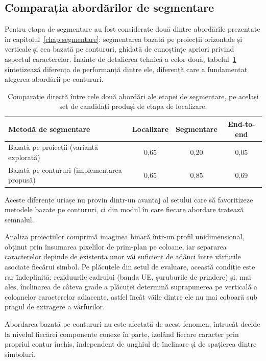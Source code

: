 \subsection{Comparația abordărilor de segmentare}
\indent\par
Pentru etapa de segmentare au fost considerate două dintre abordările prezentate în capitolul~\ref{chap:segmentare}: segmentarea bazată pe proiecții orizontale și verticale și cea bazată pe contururi, ghidată de cunoștințe apriori privind aspectul caracterelor. Înainte de detalierea tehnică a celor două, tabelul~\ref{tab:cmp-segmentare} sintetizează diferența de performanță dintre ele, diferență care a fundamentat alegerea abordării pe contururi.

\indent\par
\begin{table}[H]
  \centering
  \begin{tabular}{lccc}
    \hline
    Metodă de segmentare & Localizare & Segmentare & End-to-end \\
    \hline
    Bazată pe proiecții (variantă explorată) & 0{,}65 & 0{,}20 & 0{,}05 \\
    Bazată pe contururi (implementarea propusă) & 0{,}65 & 0{,}85 & 0{,}69 \\
    \hline
  \end{tabular}
  \caption{Comparație directă între cele două abordări ale etapei de segmentare, pe același set de candidați produși de etapa de localizare.}
  \label{tab:cmp-segmentare}
\end{table}

Aceste diferențe uriașe nu provin dintr-un avantaj al setului care să favoritizeze metodele bazate pe contururi, ci din modul în care fiecare abordare tratează semnalul.

Analiza proiecțiilor comprimă imaginea binară într-un profil unidimensional, obținut prin însumarea pixelilor de prim-plan pe coloane, iar separarea caracterelor depinde de existența unor văi suficient de adânci între vârfurile asociate fiecărui simbol. Pe plăcuțele din setul de evaluare, această condiție este rar îndeplinită: reziduurile cadrului (banda UE, șuruburile de prindere) și, mai ales, înclinarea de câteva grade a plăcuței determină suprapunerea pe verticală a coloanelor caracterelor adiacente, astfel încât văile dintre ele nu mai coboară sub pragul de extragere a vârfurilor.

Abordarea bazată pe contururi nu este afectată de acest fenomen, întrucât decide la nivelul fiecărei componente conexe în parte, izolând fiecare caracter prin propriul contur închis, independent de unghiul de înclinare și de spațierea dintre simboluri.

